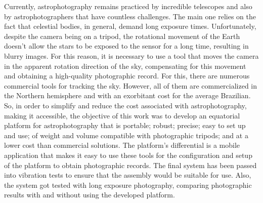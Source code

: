 Currently, astrophotography remains practiced by incredible telescopes and also by astrophotographers that have countless challenges. The main one relies on the fact that celestial bodies, in general, demand long exposure times. Unfortunately, despite the camera being on a tripod, the rotational movement of the Earth doesn't allow the stars to be exposed to the sensor for a long time, resulting in blurry images. For this reason, it is necessary to use a tool that moves the camera in the apparent rotation direction of the sky, compensating for this movement and obtaining a high-quality photographic record. For this, there are numerous commercial tools for tracking the sky. However, all of them are commercialized in the Northern hemisphere and with an exorbitant cost for the average Brazilian. So, in order to simplify and reduce the cost associated with astrophotography, making it accessible, the objective of this work was to develop an equatorial platform for astrophotography that is portable; robust; precise; easy to set up and use; of weight and volume compatible with photographic tripods; and at a lower cost than commercial solutions. The platform's differential is a mobile application that makes it easy to use these tools for the configuration and setup of the platform to obtain photographic records. The final system has been passed into vibration tests to ensure that the assembly would be suitable for use.  Also, the system got tested with long exposure photography, comparing photographic results with and without using the developed platform.